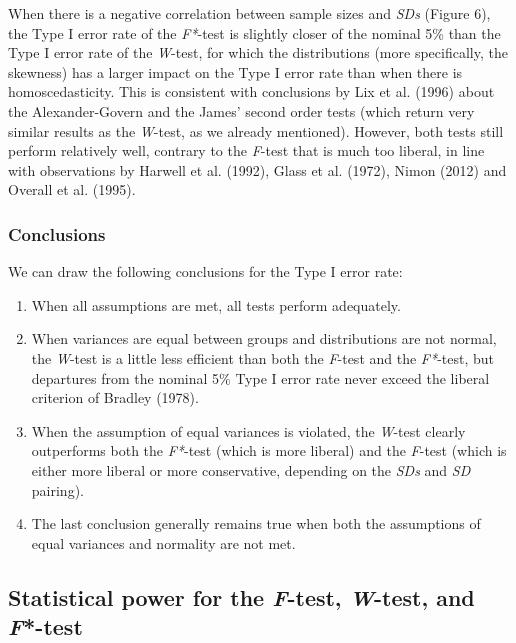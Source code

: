 \documentclass[man,floatsintext]{apa6}
\providecommand{\tightlist}{%
  \setlength{\itemsep}{0pt}\setlength{\parskip}{0pt}}
\begin{document}
When there is a negative correlation between sample sizes and \emph{SDs} (Figure 6), the Type I error rate of the \emph{F*}-test is slightly closer of the nominal 5\% than the Type I error rate of the \emph{W}-test, for which the distributions (more specifically, the skewness) has a larger impact on the Type I error rate than when there is homoscedasticity. This is consistent with conclusions by Lix et al. (1996) about the Alexander-Govern and the James' second order tests (which return very similar results as the \emph{W}-test, as we already mentioned). However, both tests still perform relatively well, contrary to the \emph{F}-test that is much too liberal, in line with observations by Harwell et al. (1992), Glass et al. (1972), Nimon (2012) and Overall et al. (1995).

\hypertarget{conclusions}{%
\subsubsection{Conclusions}\label{conclusions}}

We can draw the following conclusions for the Type I error rate:

\begin{enumerate}
\def\labelenumi{\arabic{enumi})}
\tightlist
\item
  When all assumptions are met, all tests perform adequately.\\
\item
  When variances are equal between groups and distributions are not normal, the \emph{W}-test is a little less efficient than both the \emph{F}-test and the \emph{F*}-test, but departures from the nominal 5\% Type I error rate never exceed the liberal criterion of Bradley (1978).\\
\item
  When the assumption of equal variances is violated, the \emph{W}-test clearly outperforms both the \emph{F*}-test (which is more liberal) and the \emph{F}-test (which is either more liberal or more conservative, depending on the \emph{SDs} and \emph{SD} pairing).\\
\item
  The last conclusion generally remains true when both the assumptions of equal variances and normality are not met.
\end{enumerate}

\hypertarget{statistical-power-for-the-f-test-w-test-and-f-test}{%
\subsection{\texorpdfstring{Statistical power for the \emph{F}-test, \emph{W}-test, and \emph{F}*-test}{Statistical power for the F-test, W-test, and F*-test}}\label{statistical-power-for-the-f-test-w-test-and-f-test}}
\end{document}
